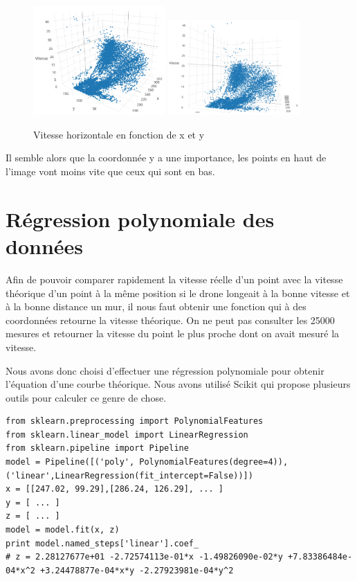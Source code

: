 \documentclass[titlepage,11pt,a4paper]{article}
\begin{document}
\begin{figure}
	\centering
	\caption{\label{vitesses-3d} Vitesse horizontale en fonction de x et y}
	\includegraphics[width=0.45\textwidth]{images/vitesses-3d-apercu.png}
	\hfill
	\includegraphics[width=0.45\textwidth]{images/vitesses-3d-selon-y.png}
\end{figure}

Il semble alors que la coordonnée y a une importance, les points en haut de l'image vont moins vite que ceux qui sont en bas.

\section{Régression polynomiale des données}
Afin de pouvoir comparer rapidement la vitesse réelle d'un point avec la vitesse théorique d'un point à la même position si le drone longeait à la bonne vitesse et à la bonne distance un mur, il nous faut obtenir une fonction qui à des coordonnées retourne la vitesse théorique. On ne peut pas consulter les \num{25000} mesures et retourner la vitesse du point le plus proche dont on avait mesuré la vitesse.

Nous avons donc choisi d'effectuer une régression polynomiale pour obtenir l'équation d'une courbe \og{}théorique\fg{}. Nous avons utilisé Scikit qui propose plusieurs outils pour calculer ce genre de chose. 

\begin{lstlisting}
from sklearn.preprocessing import PolynomialFeatures
from sklearn.linear_model import LinearRegression
from sklearn.pipeline import Pipeline
model = Pipeline([('poly', PolynomialFeatures(degree=4)), ('linear',LinearRegression(fit_intercept=False))])
x = [[247.02, 99.29],[286.24, 126.29], ... ]
y = [ ... ]
z = [ ... ]
model = model.fit(x, z)
print model.named_steps['linear'].coef_
# z = 2.28127677e+01 -2.72574113e-01*x -1.49826090e-02*y +7.83386484e-04*x^2 +3.24478877e-04*x*y -2.27923981e-04*y^2
\end{lstlisting}
\end{document}

